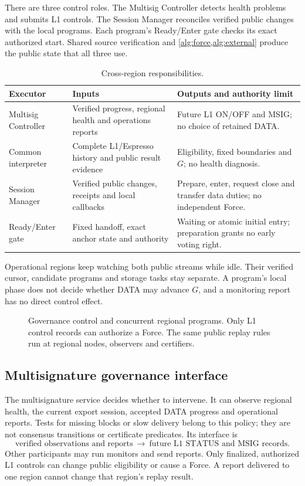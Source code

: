 \documentclass[11pt,a4paper]{article}
\begin{document}
There are three control roles. The Multisig Controller detects health
problems and submits L1 controls. The Session Manager reconciles
verified public changes with the local programs. Each program's
Ready/Enter gate checks its exact authorized start. Shared source
verification and \cref{alg:force,alg:external} produce the public state
that all three use.

\begin{table}[htbp]\centering\small
\caption{Cross-region responsibilities.}
\label{tab:runtime-modules}
\begin{tabularx}{\linewidth}{@{}p{.22\linewidth}Y Y@{}}\toprule
Executor & Inputs & Outputs and authority limit\\\midrule
Multisig Controller & Verified progress, regional health and operations
reports & Future L1 ON/OFF and MSIG; no choice of retained DATA.\\
Common interpreter & Complete L1/Espresso history and public result
evidence & Eligibility, fixed boundaries and $G$; no health diagnosis.\\
Session Manager & Verified public changes, receipts and local callbacks
& Prepare, enter, request close and transfer data duties; no independent Force.\\
Ready/Enter gate & Fixed handoff, exact anchor state and authority
& Waiting or atomic initial entry; preparation grants no early voting right.\\\bottomrule
\end{tabularx}
\end{table}

Operational regions keep watching both public streams while idle. Their
verified cursor, candidate programs and storage tasks stay separate. A
program's local phase does not decide whether DATA may advance $G$, and
a monitoring report has no direct control effect.

\begin{figure}[p]\centering

\caption{Governance control and concurrent regional programs. Only L1
control records can authorize a Force. The same public replay rules run
at regional nodes, observers and certifiers.}
\label{fig:runtime-modules}
\end{figure}
\FloatBarrier

\subsection{Multisignature governance interface}
\label{sec:runtime-controls}
The multisignature service decides whether to intervene. It can observe
regional health, the current export session, accepted DATA progress and
operational reports. Tests for missing blocks or slow delivery belong to
this policy; they are not consensus transitions or certificate
predicates. Its interface is
\[
 \text{verified observations and reports}
 \ \longrightarrow\
 \text{future L1 STATUS and MSIG records}.
\]
Other participants may run monitors and send reports. Only finalized,
authorized L1 controls can change public eligibility or cause a Force.
A report delivered to one region cannot change that region's replay
result.
\end{document}
